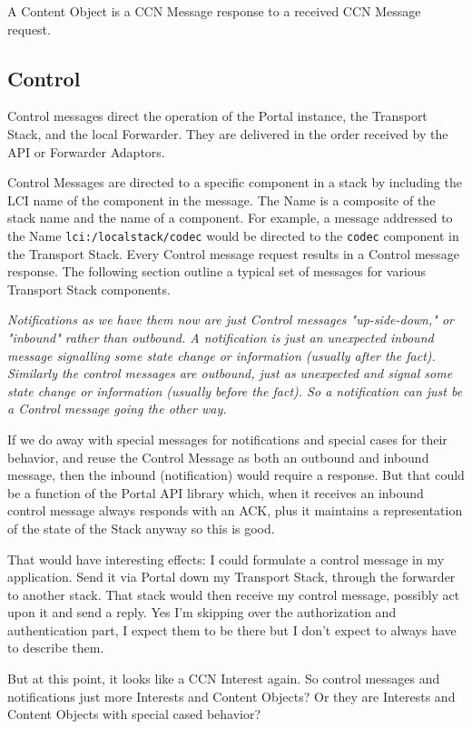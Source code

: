 A Content Object is a CCN Message response to a received CCN Message request.

\subsection{Control}
Control messages direct the operation of the Portal instance,
the Transport Stack, and the local Forwarder. They are delivered in the order received by the API or Forwarder Adaptors.

Control Messages are directed to a specific component in a stack by including the LCI name of the component in the message.  The Name is a composite of the stack name and the name of a component. For example, a message addressed to the Name {\tt lci:/localstack/codec} would be directed to the {\tt codec} component in the Transport Stack.  Every Control message request results in a Control message response. The following section outline a typical set of messages for various Transport Stack components.

{\it 
Notifications as we have them now are just Control messages "up-side-down,"
or "inbound" rather than outbound.
A notification is just an unexpected inbound message signalling some state change or information
(usually after the fact).
Similarly the control messages are outbound,
just as unexpected and signal some state change or information
(usually before the fact).
So a notification can just be a Control message going the other way.

If we do away with special messages for notifications and special cases for their behavior,
and reuse the Control Message as both an outbound and inbound message, then the inbound (notification) would require a response.
But that could be a function of the Portal API library which,
when it receives an inbound control message always responds with an ACK,
plus it maintains a representation of the state of the Stack anyway so this is good.

That would have interesting effects:
I could formulate a control message in my application.
Send it via Portal down my Transport Stack, through the forwarder to another stack.
That stack would then receive my control message, possibly act upon it and send a reply.
Yes I'm skipping over the authorization and authentication part,
I expect them to be there but I don't expect to always have to describe them.

But at this point, it looks like a CCN Interest again.
So control messages and notifications just more Interests and Content Objects?
Or they are Interests and Content Objects with special cased behavior?
}


